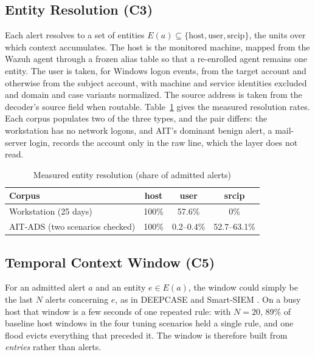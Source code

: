 \documentclass[conference]{IEEEtran}
\begin{document}
\subsection{Entity Resolution (C3)}

Each alert resolves to a set of entities $E(a) \subseteq \{\mathrm{host}, \mathrm{user}, \mathrm{srcip}\}$, the units over which context accumulates. The host is the monitored machine, mapped from the Wazuh agent through a frozen alias table so that a re-enrolled agent remains one entity. The user is taken, for Windows logon events, from the target account and otherwise from the subject account, with machine and service identities excluded and domain and case variants normalized. The source address is taken from the decoder's source field when routable. Table~\ref{tab:resolution} gives the measured resolution rates. Each corpus populates two of the three types, and the pair differs: the workstation has no network logons, and AIT's dominant benign alert, a mail-server login, records the account only in the raw line, which the layer does not read.

\begin{table}[t]
\caption{Measured entity resolution (share of admitted alerts)}
\label{tab:resolution}
\centering\footnotesize
\begin{tabular}{@{}lccc@{}}
\toprule
\textbf{Corpus} & \textbf{host} & \textbf{user} & \textbf{srcip} \\
\midrule
Workstation (25 days) & 100\% & 57.6\% & 0\% \\
AIT-ADS (two scenarios checked) & 100\% & 0.2--0.4\% & 52.7--63.1\% \\
\bottomrule
\end{tabular}
\end{table}

\subsection{Temporal Context Window (C5)}
\label{sec:window}

For an admitted alert $a$ and an entity $e \in E(a)$, the window could simply be the last $N$ alerts concerning $e$, as in DEEPCASE \cite{ref15} and Smart-SIEM \cite{ref17}. On a busy host that window is a few seconds of one repeated rule: with $N = 20$, 89\% of baseline host windows in the four tuning scenarios held a single rule, and one flood evicts everything that preceded it. The window is therefore built from \emph{entries} rather than alerts.
\end{document}
